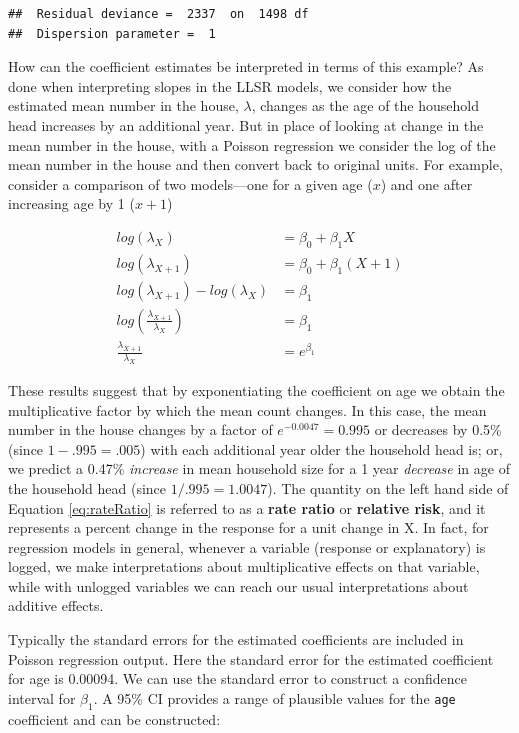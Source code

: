 \documentclass[
]{krantz}
\begin{document}
\begin{verbatim}
##  Residual deviance =  2337  on  1498 df 
##  Dispersion parameter =  1
\end{verbatim}

How can the coefficient estimates be interpreted in terms of this example? As done when interpreting slopes in the LLSR models, we consider how the estimated mean number in the house, \(\lambda\), changes as the age of the household head increases by an additional year. But in place of looking at change in the mean number in the house, with a Poisson regression we consider the log of the mean number in the house and then convert back to original units. For example, consider a comparison of two models---one for a given age (\(x\)) and one after increasing age by 1 (\(x+1\))

\begin{equation}
\begin{split}
log(\lambda_X) &= \beta_0 + \beta_1X \\
log(\lambda_{X+1}) &= \beta_0 + \beta_1(X+1) \\
log(\lambda_{X+1})-log(\lambda_X) &=  \beta_1 \\
log \left(\frac{\lambda_{X+1}}{\lambda_X}\right)   &= \beta_1\\
\frac{\lambda_{X+1}}{\lambda_X} &= e^{\beta_1}
\end{split}
\label{eq:rateRatio}
\end{equation}

These results suggest that by exponentiating the coefficient on age we obtain the multiplicative factor by which the mean count changes. In this case, the mean number in the house changes by a factor of \(e^{-0.0047}=0.995\) or decreases by 0.5\% (since \(1-.995 = .005\)) with each additional year older the household head is; or, we predict a 0.47\% \emph{increase} in mean household size for a 1 year \emph{decrease} in age of the household head (since \(1/.995=1.0047\)). The quantity on the left hand side of Equation \eqref{eq:rateRatio} is referred to as a \textbf{rate ratio} or \textbf{relative risk},  and it represents a percent change in the response for a unit change in X. In fact, for regression models in general, whenever a variable (response or explanatory) is logged, we make interpretations about multiplicative effects on that variable, while with unlogged variables we can reach our usual interpretations about additive effects.

Typically the standard errors for the estimated coefficients are included in Poisson regression output. Here the standard error for the estimated coefficient for age is 0.00094. We can use the standard error to construct a confidence interval for \(\beta_1\). A 95\% CI provides a range of plausible values for the \texttt{age} coefficient and can be constructed:
\end{document}
